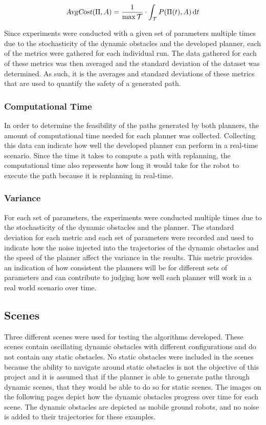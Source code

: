 \documentclass[letterpaper, 10pt, conference]{ieeeconf}
\newcommand{\Var}[1]{\ensuremath{{{\textsl{#1}}}}}
\begin{document}
\begin{equation}
    \Var{AvgCost}(\Pi, A) = \frac{1}{\max \mathcal{T}} \cdot
    \int_{\mathcal{T}} P(\Pi(t), A) \, \mathrm{d}t
    \label{eq:avg_cost_metric}
\end{equation}

Since experiments were conducted with a given set of parameters multiple times
due to the stochasticity of the dynamic obstacles and the developed planner,
each of the metrics were gathered for each individual run. The data gathered
for each of these metrics was then averaged and the standard deviation of the
dataset was determined. As such, it is the averages and standard deviations of
these metrics that are used to quantify the safety of a generated path.

\subsubsection{Computational Time}

In order to determine the feasibility of the paths generated by both planners,
the amount of computational time needed for each planner was collected.
Collecting this data can indicate how well the developed planner can perform in
a real-time scenario. Since the time it takes to compute a path with
replanning, the computational time also represents how long it would take for
the robot to execute the path because it is replanning in real-time.

\subsubsection{Variance}

For each set of parameters, the experiments were conducted multiple times due
to the stochasticity of the dynamic obstacles and the planner. The standard
deviation for each metric and each set of parameters were recorded and used to
indicate how the noise injected into the trajectories of the dynamic obstacles
and the speed of the planner affect the variance in the results. This metric
provides an indication of how consistent the planners will be for different
sets of parameters and can contribute to judging how well each planner will
work in a real world scenario over time.

\subsection{Scenes}

Three different scenes were used for testing the algorithms developed. These
scenes contain oscillating dynamic obstacles with different configurations and
do not contain any static obstacles. No static obstacles were included in the
scenes because the ability to navigate around static obstacles is not the
objective of this project and it is assumed that if the planner is able to
generate paths through dynamic scenes, that they would be able to do so for
static scenes. The images on the following pages depict how the dynamic
obstacles progress over time for each scene. The dynamic obstacles are depicted
as mobile ground robots, and no noise is added to their trajectories for these
examples.
\end{document}
